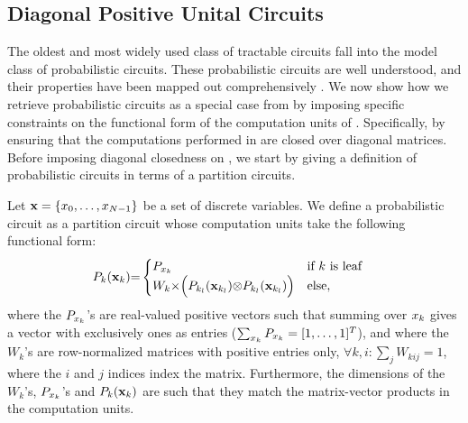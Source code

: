\subsection{Diagonal Positive Unital Circuits}
\label{sec:diagcircuits}

The oldest and most widely used class of tractable circuits fall into the model class of probabilistic circuits. These probabilistic circuits are well understood, and their properties have been mapped out comprehensively \citep{vergari2021compositional}. We now show how we retrieve probabilistic circuits as a special case from \puncs by imposing specific constraints on the functional form of the computation units of \puncs. Specifically, by ensuring that the computations performed in \puncs are closed over diagonal matrices. Before imposing diagonal closedness on \puncs, we start by giving a definition of probabilistic circuits in terms of a partition circuits.




\begin{definition}
	\label{def:sdprobabilisticcircuit}
	Let   $\mathbf{x} = \{x_0, \allowbreak \dots ,\allowbreak x_{N{-}1}  \}$ be a set of discrete variables.
	We define a probabilistic circuit as a partition circuit whose computation units take the following functional form:
	\begin{align}
		 & {P}_k(\mathbf{x}_k){=}
		\begin{cases}
			P_{x_k}
			 & \text{if $k$ is leaf}
			\\
			W_k {\times} \Bigl(P_{k_l}(\mathbf{x}_{k_l}) {\otimes} P_{k_l}(\mathbf{x}_{k_l}) \Bigr)
			 & \text{else},
		\end{cases}
		\nonumber
	\end{align}
	where the  $P_{x_k}$'s are real-valued positive vectors such that summing over $x_k$ gives a vector with exclusively ones as entries ($\sum_{x_k} P_{x_k}= [ 1, \dots, 1 ]^T$), and where the $W_k$'s are row-normalized matrices with positive entries only, \ie $\forall k,i: \sum_j W_{kij}=1$, where the $i$ and $j$ indices index the matrix. Furthermore, the dimensions of the $W_k$'s, $P_{x_k}$'s and $P_k(\mathbf{x}_k)$ are such that they match the matrix-vector products in the computation units.
\end{definition}





